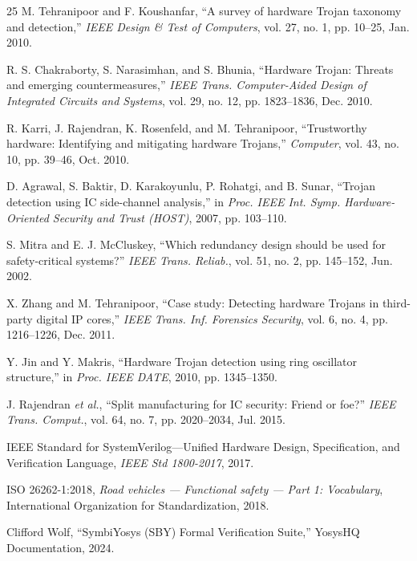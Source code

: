 \documentclass[conference]{IEEEtran}
\begin{document}
\begin{thebibliography}{25}
M. Tehranipoor and F. Koushanfar, ``A survey of hardware Trojan taxonomy and detection,'' \textit{IEEE Design \& Test of Computers}, vol. 27, no. 1, pp. 10--25, Jan. 2010.

R. S. Chakraborty, S. Narasimhan, and S. Bhunia, ``Hardware Trojan: Threats and emerging countermeasures,'' \textit{IEEE Trans. Computer-Aided Design of Integrated Circuits and Systems}, vol. 29, no. 12, pp. 1823--1836, Dec. 2010.

R. Karri, J. Rajendran, K. Rosenfeld, and M. Tehranipoor, ``Trustworthy hardware: Identifying and mitigating hardware Trojans,'' \textit{Computer}, vol. 43, no. 10, pp. 39--46, Oct. 2010.

D. Agrawal, S. Baktir, D. Karakoyunlu, P. Rohatgi, and B. Sunar, ``Trojan detection using IC side-channel analysis,'' in \textit{Proc. IEEE Int. Symp. Hardware-Oriented Security and Trust (HOST)}, 2007, pp. 103--110.

S. Mitra and E. J. McCluskey, ``Which redundancy design should be used for safety-critical systems?'' \textit{IEEE Trans. Reliab.}, vol. 51, no. 2, pp. 145--152, Jun. 2002.

X. Zhang and M. Tehranipoor, ``Case study: Detecting hardware Trojans in third-party digital IP cores,'' \textit{IEEE Trans. Inf. Forensics Security}, vol. 6, no. 4, pp. 1216--1226, Dec. 2011.

Y. Jin and Y. Makris, ``Hardware Trojan detection using ring oscillator structure,'' in \textit{Proc. IEEE DATE}, 2010, pp. 1345--1350.

J. Rajendran \textit{et al.}, ``Split manufacturing for IC security: Friend or foe?'' \textit{IEEE Trans. Comput.}, vol. 64, no. 7, pp. 2020--2034, Jul. 2015.

IEEE Standard for SystemVerilog---Unified Hardware Design, Specification, and Verification Language, \textit{IEEE Std 1800-2017}, 2017.

ISO 26262-1:2018, \textit{Road vehicles --- Functional safety --- Part 1: Vocabulary}, International Organization for Standardization, 2018.

Clifford Wolf, ``SymbiYosys (SBY) Formal Verification Suite,'' YosysHQ Documentation, 2024.


\end{thebibliography}
\end{document}
